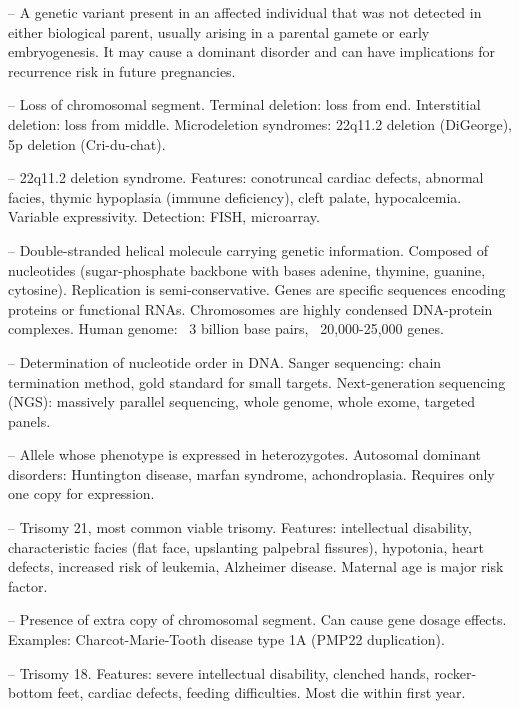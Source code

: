 -- A genetic variant present in an affected individual that was not detected in either biological parent, usually arising in a parental gamete or early embryogenesis. It may cause a dominant disorder and can have implications for recurrence risk in future pregnancies.

-- Loss of chromosomal segment. Terminal deletion: loss from end. Interstitial deletion: loss from middle. Microdeletion syndromes: 22q11.2 deletion (DiGeorge), 5p deletion (Cri-du-chat).

-- 22q11.2 deletion syndrome. Features: conotruncal cardiac defects, abnormal facies, thymic hypoplasia (immune deficiency), cleft palate, hypocalcemia. Variable expressivity. Detection: FISH, microarray.

-- Double-stranded helical molecule carrying genetic information. Composed of nucleotides (sugar-phosphate backbone with bases adenine, thymine, guanine, cytosine). Replication is semi-conservative. Genes are specific sequences encoding proteins or functional RNAs. Chromosomes are highly condensed DNA-protein complexes. Human genome: ~3 billion base pairs, ~20,000-25,000 genes.

-- Determination of nucleotide order in DNA. Sanger sequencing: chain termination method, gold standard for small targets. Next-generation sequencing (NGS): massively parallel sequencing, whole genome, whole exome, targeted panels.

-- Allele whose phenotype is expressed in heterozygotes. Autosomal dominant disorders: Huntington disease, marfan syndrome, achondroplasia. Requires only one copy for expression.

-- Trisomy 21, most common viable trisomy. Features: intellectual disability, characteristic facies (flat face, upslanting palpebral fissures), hypotonia, heart defects, increased risk of leukemia, Alzheimer disease. Maternal age is major risk factor.

-- Presence of extra copy of chromosomal segment. Can cause gene dosage effects. Examples: Charcot-Marie-Tooth disease type 1A (PMP22 duplication).

-- Trisomy 18. Features: severe intellectual disability, clenched hands, rocker-bottom feet, cardiac defects, feeding difficulties. Most die within first year.


